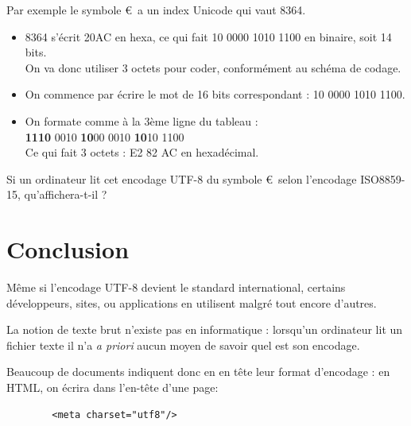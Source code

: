 Par exemple le symbole €\  a un index Unicode qui vaut 8364.\\
\begin{itemize}
    \item 	8364 s'écrit 20AC en hexa, ce qui fait 10 0000 1010 1100 en binaire, soit 14 bits.\\
          On va donc utiliser 3 octets pour coder, conformément au schéma de codage.
    \item 	On commence par écrire le mot de 16 bits correspondant : 10 0000 1010 1100.\\
    \item 	On formate comme à la 3ème ligne du tableau : \\

          \textbf{1110} 0010 \textbf{10}00 0010 \textbf{10}10 1100\\

          Ce qui fait 3 octets : E2 82 AC en hexadécimal.\\

\end{itemize}


\begin{exercice}[]
    Si un ordinateur lit cet encodage UTF-8 du symbole €\  selon l'encodage ISO8859-15, qu'affichera-t-il ?\\

\end{exercice}


\section{Conclusion}

Même si l'encodage UTF-8 devient le standard international, certains développeurs, sites, ou applications en utilisent malgré tout encore
d'autres.\\

\begin{propriete}
    La notion de texte brut n'existe pas en informatique : lorsqu'un ordinateur lit un fichier texte il n'a \textit{a priori} aucun moyen de savoir
    quel est son encodage.
\end{propriete}

Beaucoup de documents indiquent donc en en tête leur format d'encodage : en HTML, on écrira dans l'en-tête d'une page:
\begin{html}
    \begin{verbatim}
        <meta charset="utf8"/>
    \end{verbatim}
\end{html}

